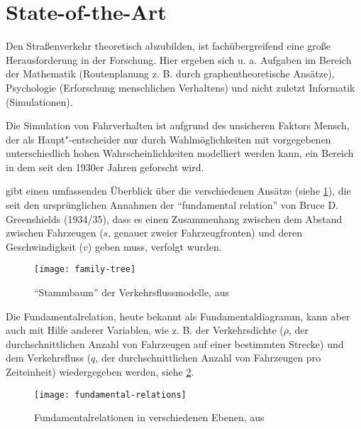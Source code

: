\section{State-of-the-Art}
\label{sec:sota}


Den Straßenverkehr theoretisch abzubilden, ist fachübergreifend eine große Herausforderung in der Forschung.
Hier ergeben sich u. a. Aufgaben im Bereich der Mathematik (Routenplanung z. B. durch graphentheoretische Ansätze), Psychologie (Erforschung menschlichen Verhaltens) und nicht zuletzt Informatik (Simulationen).

Die Simulation von Fahrverhalten ist aufgrund des unsicheren Faktors Mensch, der als Haupt"-entscheider nur durch Wahlmöglichkeiten mit vorgegebenen unterschiedlich hohen Wahrscheinlichkeiten modelliert werden kann, ein Bereich in dem seit den 1930er Jahren geforscht wird.

\cite{genealogy} gibt einen umfassenden Überblick über die verschiedenen Ansätze (siehe \cref{figure:family-tree}), die seit den ursprünglichen Annahmen der \enquote{fundamental relation} von Bruce D. Greenshields (1934/35), dass es einen Zusammenhang zwischen dem Abstand zwischen Fahrzeugen ($s$, genauer zweier Fahrzeugfronten) und deren Geschwindigkeit ($v$) geben muss, verfolgt wurden. 
\begin{figure}[hptb]
 \centering
 \texttt{[image: family-tree]}
 \caption[Überblick über die Entwicklung der Verkehrsflussmodelle]
 		{\enquote{Stammbaum} der Verkehrsflussmodelle, aus \cite{genealogy}}
 \label{figure:family-tree}
\end{figure}
\noindent
Die Fundamentalrelation, heute bekannt als Fundamentaldiagramm, kann aber auch mit Hilfe anderer Variablen, wie z. B. der Verkehrsdichte ($\rho$, der durchschnittlichen Anzahl von Fahrzeugen auf einer bestimmten Strecke) und dem Verkehrsfluss ($q$, der durchschnittlichen Anzahl von Fahrzeugen pro Zeiteinheit) wiedergegeben werden, siehe \cref{figure:fundamental-relations}. 
\begin{figure}[hptb]
 \centering
 \texttt{[image: fundamental-relations]}
 \caption[Fundamentalrelationen in verschiedenen Ebenen]
 		{Fundamentalrelationen in verschiedenen Ebenen, aus \cite{genealogy}}
 \label{figure:fundamental-relations}
\end{figure}

